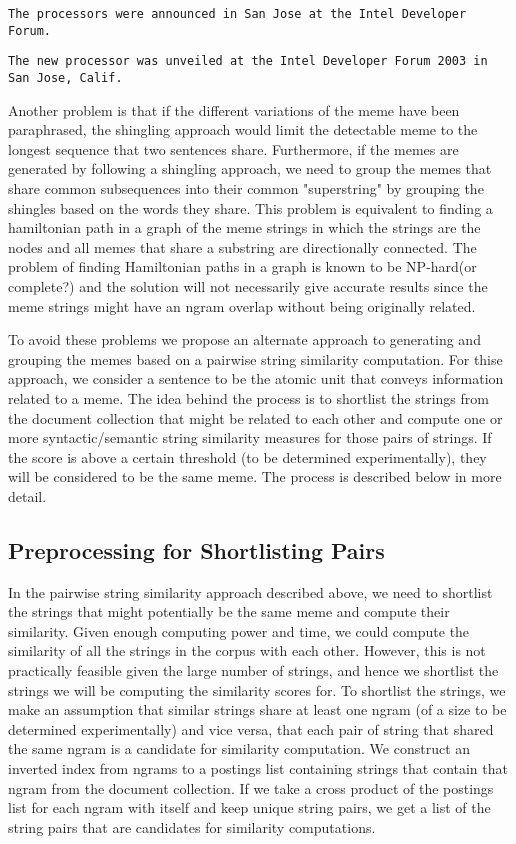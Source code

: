 \documentclass{acm_proc_article-sp}
\begin{document}
{\tt The processors were announced in San Jose at the Intel Developer Forum.}

{\tt The new processor was unveiled at the Intel Developer Forum 2003 in San Jose, Calif.}

Another problem is that if the different variations of the meme have been paraphrased, the shingling approach would limit the detectable meme to the longest sequence that two sentences share. Furthermore, if the memes are generated by following a shingling approach, we need to group the memes that share common subsequences into their common "superstring" by grouping the shingles based on the words they share. This problem is equivalent to finding a hamiltonian path in a graph of the meme strings in which the strings are the nodes and all memes that share a substring are directionally connected. The problem of finding Hamiltonian paths in a graph is known to be NP-hard(or complete?) and the solution will not necessarily give accurate results since the meme strings might have an ngram overlap without being originally related.

To avoid these problems we propose an alternate approach to generating and grouping the memes based on a pairwise string similarity computation. For thise approach, we consider a sentence to be the atomic unit that conveys information related to a meme. The idea behind the process is to shortlist the strings from the document collection that might be related to each other and compute one or more syntactic/semantic string similarity measures for those pairs of strings. If the score is above a certain threshold (to be determined experimentally), they will be considered to be the same meme. The process is described below in more detail.

\subsection{Preprocessing for Shortlisting Pairs}
In the pairwise string similarity approach described above, we need to shortlist the strings that might potentially be the same meme and compute their similarity. Given enough computing power and time, we could compute the similarity of all the strings in the corpus with each other. However, this is not practically feasible given the large number of strings, and hence we shortlist the strings we will be computing the similarity scores for. To shortlist the strings, we make an assumption that similar strings share at least one ngram (of a size to be determined experimentally) and vice versa, that each pair of string that shared the same ngram is a candidate for similarity computation. We construct an inverted index from ngrams to a postings list containing strings that contain that ngram from the document collection. If we take a cross product of the postings list for each ngram with itself and keep unique string pairs, we get a list of the string pairs that are candidates for similarity computations.
\end{document}
